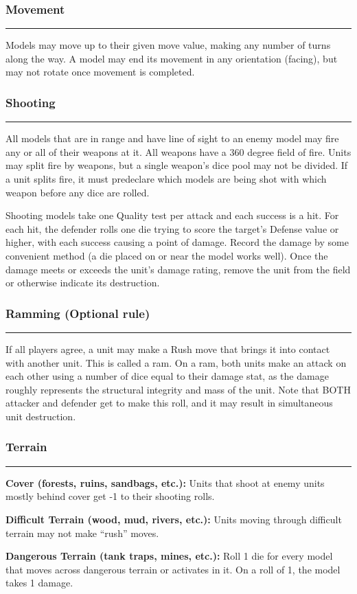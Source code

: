 \documentclass[11pt]{article}
\newcommand{\myheading}[1]{
  \subsubsection*{\centering #1}
  \raggedright
  \hrule
}
\renewenvironment{description}
  {\list{}{\labelwidth=0pt \leftmargin=0pt
   \let\makelabel\descriptionlabel}}
  {\endlist}
\newenvironment{mydescription}{
\begin{description}
  \setlength{\itemsep}{1pt}
  \setlength{\parskip}{0pt}
  \setlength{\parsep}{0pt}}{\end{description}
}
\begin{document}
\begin{multicols*}{3}[]
\myheading{Movement}

Models may move up to their given move value, making any number of
turns along the way. A model may end its movement in any orientation
(facing), but may not rotate once movement is completed.

\myheading{Shooting}

All models that are in range and have line of sight to an enemy model
may fire any or all of their weapons at it. All weapons have a 360
degree field of fire. Units may split fire by weapons, but a single
weapon’s dice pool may not be divided. If a unit splits fire, it must
predeclare which models are being shot with which weapon before any
dice are rolled.

Shooting models take one Quality test per attack and each success is a
hit. For each hit, the defender rolls one die trying to score the
target’s Defense value or higher, with each success causing a point of
damage. Record the damage by some convenient method (a die placed on
or near the model works well). Once the damage meets or exceeds the
unit’s damage rating, remove the unit from the field or otherwise
indicate its destruction.

\myheading{Ramming (Optional rule)}

If all players agree, a unit may make a Rush move that brings it into
contact with another unit. This is called a ram. On a ram, both units
make an attack on each other using a number of dice equal to their
damage stat, as the damage roughly represents the structural integrity
and mass of the unit. Note that BOTH attacker and defender get to make
this roll, and it may result in simultaneous unit destruction.

\myheading{Terrain}

\begin{mydescription}

\item{\bf Cover (forests, ruins, sandbags, etc.):} Units that shoot at
  enemy units mostly behind cover get -1 to their shooting rolls.

\item{\bf Difficult Terrain (wood, mud, rivers, etc.):} Units moving
  through difficult terrain may not make “rush” moves.

\item{\bf Dangerous Terrain (tank traps, mines, etc.):} Roll 1 die for
  every model that moves across dangerous terrain or activates in
  it. On a roll of 1, the model takes 1 damage.


\end{mydescription}
\end{multicols*}
\end{document}
